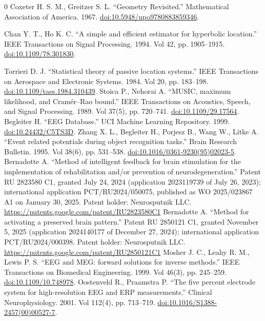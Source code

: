 \documentclass{article}
\begin{document}
\begin{thebibliography}{0}
 Coxeter H. S. M., Greitzer S. L. ``Geometry Revisited.'' Mathematical Association of America. 1967. \href{https://doi.org/10.5948/upo9780883859346}{doi:10.5948/upo9780883859346}.

 Chan Y. T., Ho K. C. ``A simple and efficient estimator for hyperbolic location.'' IEEE Transactions on Signal Processing. 1994. Vol 42, pp. 1905--1915. \href{https://doi.org/10.1109/78.301830}{doi:10.1109/78.301830}.

 Torrieri D. J. ``Statistical theory of passive location systems.'' IEEE Transactions on Aerospace and Electronic Systems. 1984. Vol 20, pp. 183--198. \href{https://doi.org/10.1109/taes.1984.310439}{doi:10.1109/taes.1984.310439}.
 Stoica P., Nehorai A. ``MUSIC, maximum likelihood, and Cram\'er--Rao bound.'' IEEE Transactions on Acoustics, Speech, and Signal Processing. 1989. Vol 37(5), pp. 720--741. \href{https://doi.org/10.1109/29.17564}{doi:10.1109/29.17564}.
 Begleiter H. ``EEG Database.'' UCI Machine Learning Repository. 1999. \href{https://doi.org/10.24432/C5TS3D}{doi:10.24432/C5TS3D}.
 Zhang X. L., Begleiter H., Porjesz B., Wang W., Litke A. ``Event related potentials during object recognition tasks.'' Brain Research Bulletin. 1995. Vol 38(6), pp. 531--538. \href{https://doi.org/10.1016/0361-9230(95)02023-5}{doi:10.1016/0361-9230(95)02023-5}.
 Bernadotte A. ``Method of intelligent feedback for brain stimulation for the implementation of rehabilitation and/or prevention of neurodegeneration.'' Patent RU 2823580 C1, granted July 24, 2024 (application 2023119739 of July 26, 2023); international application PCT/RU2024/050075, published as WO 2025/023867 A1 on January 30, 2025. Patent holder: Neurosputnik LLC. \url{https://patents.google.com/patent/RU2823580C1}
 Bernadotte A. ``Method for activating a preserved brain pattern.'' Patent RU 2850121 C1, granted November 5, 2025 (application 2024140177 of December 27, 2024); international application PCT/RU2024/000398. Patent holder: Neurosputnik LLC. \url{https://patents.google.com/patent/RU2850121C1}
 Mosher J. C., Leahy R. M., Lewis P. S. ``EEG and MEG: forward solutions for inverse methods.'' IEEE Transactions on Biomedical Engineering. 1999. Vol 46(3), pp. 245--259. \href{https://doi.org/10.1109/10.748978}{doi:10.1109/10.748978}.
 Oostenveld R., Praamstra P. ``The five percent electrode system for high-resolution EEG and ERP measurements.'' Clinical Neurophysiology. 2001. Vol 112(4), pp. 713--719. \href{https://doi.org/10.1016/S1388-2457(00)00527-7}{doi:10.1016/S1388-2457(00)00527-7}.

\end{thebibliography}
\end{document}
